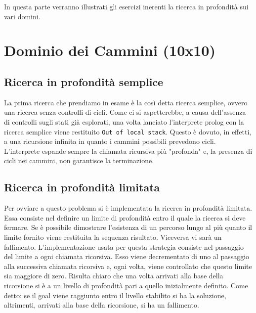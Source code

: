 In questa parte verranno illustrati gli esercizi inerenti la ricerca in profondità sui vari domini.

\section{Dominio dei Cammini (10x10)}
\subsection{Ricerca in profondità semplice} \label{sub:10-prof-semplice}
La prima ricerca che prendiamo in esame è la così detta ricerca semplice, ovvero una ricerca senza controlli di cicli. Come ci si aspetterebbe, a causa dell'assenza di controlli sugli stati già esplorati, una volta lanciato l'interprete prolog con la ricerca semplice viene restituito \texttt{Out of local stack}. Questo è dovuto, in effetti, a una ricursione infinita in quanto i cammini possibili prevedono cicli. L'interprete espande sempre la chiamata ricursiva più "profonda" e, la presenza di cicli nei cammini, non garantisce la terminazione.
\subsection{Ricerca in profondità limitata} \label{sub:10-prof-limitata}
Per ovviare a questo problema si è implementata la ricerca in profondità limitata. Essa consiste nel definire un limite di profondità entro il quale la ricerca si deve fermare. Se è possibile dimostrare l'esistenza di un percorso lungo al più quanto il limite fornito viene restituita la sequenza risultato. Viceversa vi sarà un fallimento.
L'implementazione usata per questa strategia consiste nel passaggio del limite a ogni chiamata ricorsiva. Esso viene decrementato di uno al passaggio alla successiva chiamata ricorsiva e, ogni volta, viene controllato che questo limite sia maggiore di zero. Risulta chiaro che una volta arrivati alla base della ricorsione si è a un livello di profondità pari a quello inizialmente definito. Come detto: se il goal viene raggiunto entro il livello stabilito si ha la soluzione, altrimenti, arrivati alla base della ricorsione, si ha un fallimento.
